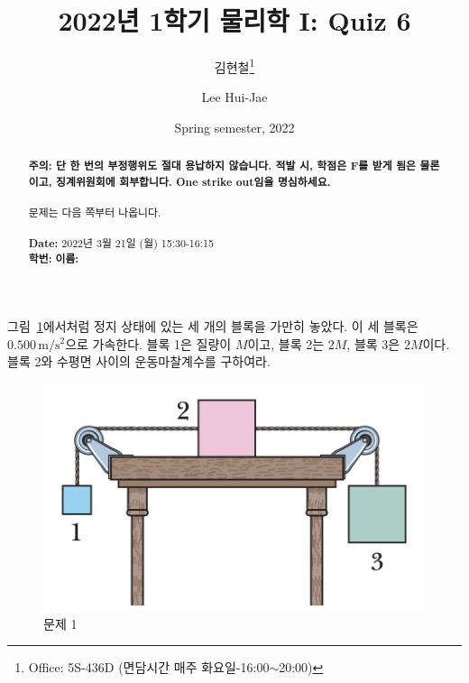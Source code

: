 \documentclass[floatfix,nofootinbib,superscriptaddress,fleqn,preprint]{revtex4}
\begin{document}
\title{\Large 2022년 1학기 물리학 I: Quiz 6}
\author{김현철\footnote{Office: 5S-436D (면담시간 매주
    화요일-16:00$\sim$20:00)}} 
\author{Lee Hui-Jae} 
\date{Spring semester, 2022}


\vspace{1.cm}
\begin{abstract}
\noindent \textbf{ {\color{red}주의}: \color{blue} 단 한 번의 부정행위도 절대
  용납하지 않습니다. 적발 시, 학점은 F를 받게 됨은 물론이고,
  징계위원회에 회부합니다. One strike out임을 명심하세요.}\\
\\
문제는 다음 쪽부터 나옵니다.  \\ \\
{\bf Date:} 2022년 3월 21일 (월) 15:30-16:15 
\\
{\bf 학번:} \hspace{4cm}
{\bf 이름:} 

\end{abstract}
\maketitle

그림~\ref{fig:1}에서처럼 정지 상태에 있는 세 개의 블록을 가만히
놓았다. 이 세 블록은 $0.500\,\mathrm{m/s^2}$으로 가속한다. 블록 1은
질량이 $M$이고, 블록 2는 $2M$, 블록 3은 $2M$이다. 블록 2와 수평면
사이의 운동마찰계수를 구하여라.
\begin{figure}[ht]
  \centering
\includegraphics[scale=0.43]{Qfig6-1-20220321.png}  
  \caption{문제 1}
  \label{fig:1}
\end{figure}
\end{document}
